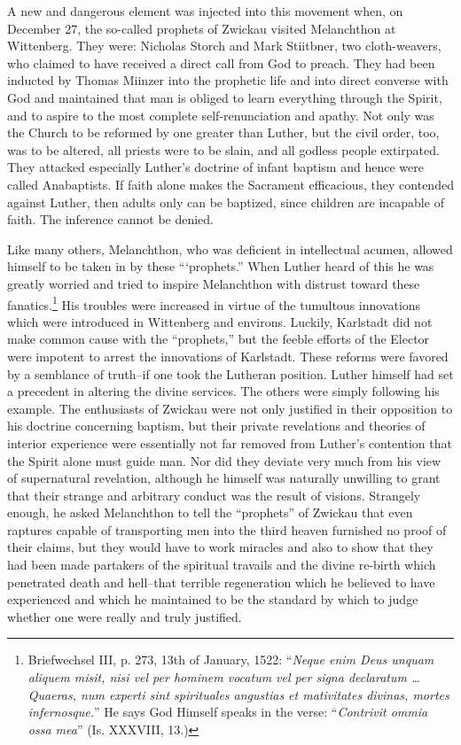 A new and dangerous element was injected into this movement
when, on December 27, the so-called prophets of Zwickau visited
Melanchthon at Wittenberg. They were: Nicholas Storch and Mark
Stiitbner, two cloth-weavers, who claimed to have received a direct
call from God to preach. They had been inducted by Thomas Miinzer into
the prophetic life and into direct converse with God and
maintained that man is obliged to learn everything through the Spirit,
and to aspire to the most complete self-renunciation and apathy. Not
only was the Church to be reformed by one greater than Luther, but
the civil order, too, was to be altered, all priests were to be slain, and
all godless people extirpated. They attacked especially Luther’s doctrine
of infant baptism and hence were called Anabaptists. If faith
alone makes the Sacrament efficacious, they contended against Luther,
then adults only can be baptized, since children are incapable of faith.
The inference cannot be denied.

Like many others, Melanchthon, who was deficient in intellectual
acumen, allowed himself to be taken in by these “‘prophets.” When
Luther heard of this he was greatly worried and tried to inspire
Melanchthon with distrust toward these fanatics.\footnote
{Briefwechsel III, p. 273, 13th of January, 1522: “\textit{Neque enim Deus unquam aliquem
misit, nisi vel per hominem vocatum vel per signa declaratum \dots Quaeras, num experti
sint spirituales angustias et mativitates divinas, mortes infernosque.}” He says God Himself
speaks in the verse: “\textit{Contrivit ommia ossa mea}” (Is. XXXVIII, 13.)}
His troubles were
increased in virtue of the tumultous innovations which were introduced
in Wittenberg and environs. Luckily, Karlstadt did not make
common cause with the “prophets,” but the feeble efforts of the
Elector were impotent to arrest the innovations of Karlstadt.
These reforms were favored by a semblance of truth--if one
took the Lutheran position. Luther himself had set a precedent in
altering the divine services. The others were simply following his example.
The enthusiasts of Zwickau were not only justified in their
opposition to his doctrine concerning baptism, but their private revelations
and theories of interior experience were essentially not far
removed from Luther’s contention that the Spirit alone must
guide man. Nor did they deviate very much from his view of supernatural
revelation, although he himself was naturally unwilling to
grant that their strange and arbitrary conduct was the result of
visions. Strangely enough, he asked Melanchthon to tell the “prophets”
of Zwickau that even raptures capable of transporting men
into the third heaven furnished no proof of their claims, but they
would have to work miracles and also to show that they had been
made partakers of the spiritual travails and the divine re-birth which
penetrated death and hell--that terrible regeneration which he believed
to have experienced and which he maintained to be the standard by which
to judge whether one were really and truly justified.


